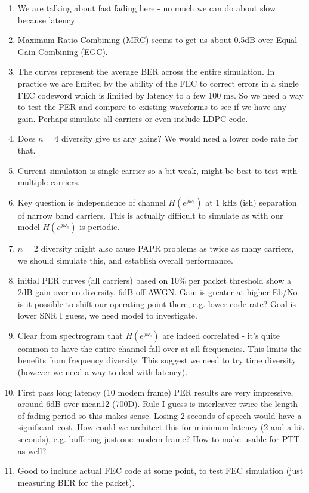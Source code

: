 \documentclass{article}
\begin{document}
\begin{enumerate}
\item We are talking about fast fading here - no much we can do about slow because latency
\item Maximum Ratio Combining (MRC) seems to get us about 0.5dB over Equal Gain Combining (EGC).
\item The curves represent the average BER across the entire simulation.  In practice we are limited by the ability of the FEC to correct errors in a single FEC codeword which is limited by latency to a few 100 ms. So we need a way to test the PER and compare to existing waveforms to see if we have any gain.  Perhaps simulate all carriers or even include LDPC code.
\item Does $n=4$ diversity give us any gains?  We would need a lower code rate for that.
\item Current simulation is single carrier so a bit weak, might be best to test with multiple carriers.
\item Key question is independence of channel $H(e^{j\omega_c})$ at 1 kHz (ish) separation of narrow band carriers.  This is actually difficult to simulate as with our model $H(e^{j\omega_c})$ is periodic.
\item $n=2$ diversity might also cause PAPR problems as twice as many carriers, we should simulate this, and establish overall performance.
\item initial PER curves (all carriers) based on 10\% per packet threshold show a 2dB gain over no diversity.  6dB off AWGN. Gain is greater at higher Eb/No - is it possible to shift our operating point there, e.g. lower code rate?  Goal is lower SNR I guess, we need  model to investigate.
\item Clear from spectrogram that $H(e^{j\omega_c})$ are indeed correlated - it's quite common to have the entire channel fall over at all frequencies.  This limits the benefits from frequency diversity.  This suggest we need to try time diversity (however we need a way to deal with latency).
\item First pass long latency (10 modem frame) PER results are very impressive, around 6dB over mean12 (700D).  Rule I guess is interleaver twice the length of fading period so this makes sense.  Losing 2 seconds of speech would have a significant cost.  How could we architect this for minimum latency (2 and a bit seconds), e.g. buffering just one modem frame?  How to make usable for PTT as well?
\item Good to include actual FEC code at some point, to test FEC simulation (just measuring BER for the packet).
\end{enumerate}
\end{document}
